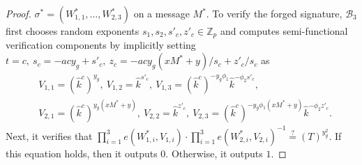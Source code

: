 \documentclass[11pt,letterpaper]{article}
\newcommand{\Z}{\mathbb{Z}}
\newcommand{\mc}[1]{\mathcal{#1}}
\begin{document}
\begin{proof}
$\sigma^* = (W_{1,1}^*, \ldots, W_{2,3}^*)$ on a message $M^*$. To verify the
forged signature, $\mc{B}_3$ first chooses random exponents $s_1, s_2, s'_c,
z'_c \in \Z_p$ and computes semi-functional verification components by
implicitly setting
    $t = c,~ s_c = -ac y_g + s'_c,~ z_c = -ac y_g (xM^*+y)/s_c + z'_c/s_c$
as
    \begin{align*}
    &   V_{1,1} = (\hat{k}^c)^{y_g},~
        V_{1,2} = \hat{k}^{s'_c},~
        V_{1,3} = (\hat{k}^c)^{-y_g \phi_1} \hat{k}^{-\phi_2 s'_c}, \\
    &   V_{2,1} = (\hat{k}^c)^{y_g (xM^*+y)},~
        V_{2,2} = \hat{k}^{z'_c},~
        V_{2,3} = (\hat{k}^c)^{-y_g \phi_1 (xM^*+y)} \hat{k}^{-\phi_2 z'_c}.
    \end{align*}
Next, it verifies that $\prod_{i=1}^3 e(W_{1,i}^*, V_{1,i}) \cdot
\prod_{i=1}^3 e(W_{2,i}^*, V_{2,i})^{-1} \stackrel{?}{=} (T)^{y_g^2}.$ If
this equation holds, then it outputs $0$. Otherwise, it outputs $1$.


\end{proof}
\end{document}
